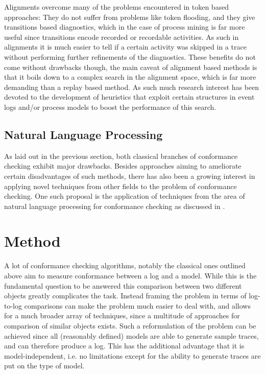 \documentclass[runningheads]{template/llncs}
\begin{document}

Alignments overcome many of the problems encountered in token based approaches: 
They do not suffer from problems like token flooding, and they give transitions based diagnostics, which in the case of process mining is far more useful since transitions encode recorded or recordable activities. 
As such in alignments it is much easier to tell if a certain activity was skipped in a trace without performing further refinements of the diagnostics.
These benefits do not come without drawbacks though, the main caveat of alignment based methods is that it boils down to a complex search in the alignment space, which is far more demanding than a replay based method.
As such much research interest has been devoted to the development of heuristics that exploit certain  structures in event logs and/or process models to boost the performance of this search.

\subsection{Natural Language Processing}

As laid out in the previous section, both classical branches of conformance checking exhibit major drawbacks.
Besides approaches aiming to ameliorate certain disadvantages of such methods, there has also been a growing interest in applying novel techniques from other fields to the problem of conformance checking.
One such proposal is the application of techniques from the area of natural language processing for conformance checking as discussed in \cite{PBWe20}.

\section{Method}

A lot of conformance checking algorithms, notably the classical ones outlined above aim to measure conformance between a log and a model.
While this is the fundamental question to be answered this comparison between two different objects greatly complicates the task.
Instead framing the problem in terms of log-to-log comparisons can make the problem much easier to deal with, and allows for a much broader array of techniques, since a multitude of approaches for comparison of similar objects exists.
Such a reformulation of the problem can be achieved since all (reasonably defined) models are able to generate sample traces, and can therefore produce a log.
This has the additional advantage that it is model-independent, i.e. no limitations except for the ability to generate traces are put on the type of model.
\end{document}
